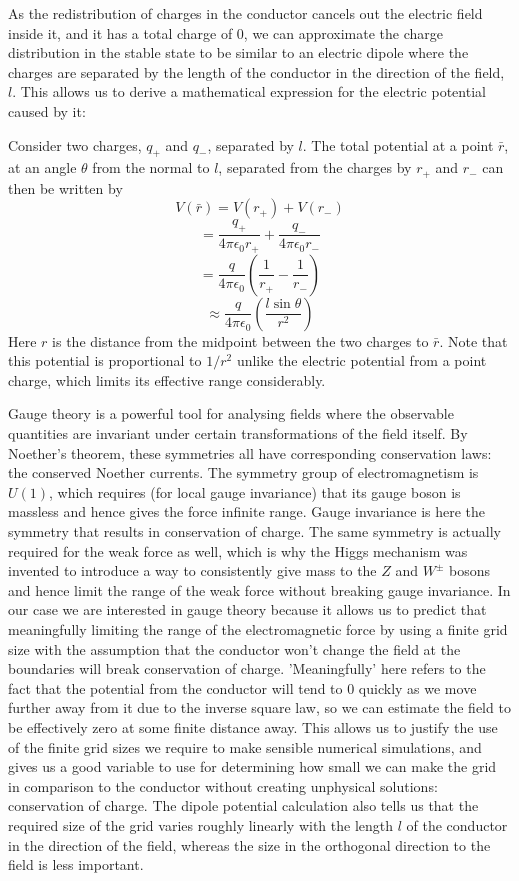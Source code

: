 \documentclass[a4paper,10pt]{article}
\begin{document}
As the redistribution of charges in the conductor cancels out the electric field inside it, and it has a total charge of 0, we can approximate the charge distribution in the stable state to be similar to an electric dipole where the charges are separated by the length of the conductor in the direction of the field, $l$. This allows us to derive a mathematical expression for the electric potential caused by it:

Consider two charges, $q_+$ and $q_-$, separated by $l$. The total potential at a point $\bar{r}$, at an angle $\theta$ from the normal to $l$, separated from the charges by $r_+$ and $r_-$ can then be written by
\[V(\bar{r}) = V(r_+) + V(r_-) \]
\[ = \frac{q_+}{4 \pi \epsilon_0 r_+} + \frac{q_-}{4 \pi \epsilon_0 r_-} \]
\[ = \frac{q}{4 \pi \epsilon_0}\left( \frac{1}{r_+} - \frac{1}{r_-} \right) \]
\[ \approx \frac{q}{4 \pi \epsilon_0} \left( \frac{l \sin\theta}{r^2} \right) \]
Here $r$ is the distance from the midpoint between the two charges to $\bar{r}$. Note that this potential is proportional to $1/r^2$ unlike the electric potential from a point charge, which limits its effective range considerably.

Gauge theory is a powerful tool for analysing fields where the observable quantities are invariant under certain transformations of the field itself. By Noether's theorem, these symmetries all have corresponding conservation laws: the conserved Noether currents. The symmetry group of electromagnetism is $U(1)$, which requires (for local gauge invariance) that its gauge boson is massless and hence gives the force infinite range. Gauge invariance is here the symmetry that results in conservation of charge. The same symmetry is actually required for the weak force as well, which is why the Higgs mechanism was invented to introduce a way to consistently give mass to the $Z$ and $W^{\pm}$ bosons and hence limit the range of the weak force without breaking gauge invariance. In our case we are interested in gauge theory because it allows us to predict that meaningfully limiting the range of the electromagnetic force by using a finite grid size with the assumption that the conductor won't change the field at the boundaries will break conservation of charge. 'Meaningfully' here refers to the fact that the potential from the conductor will tend to 0 quickly as we move further away from it due to the inverse square law, so we can estimate the field to be effectively zero at some finite distance away. This allows us to justify the use of the finite grid sizes we require to make sensible numerical simulations, and gives us a good variable to use for determining how small we can make the grid in comparison to the conductor without creating unphysical solutions: conservation of charge. The dipole potential calculation also tells us that the required size of the grid varies roughly linearly with the length $l$ of the conductor in the direction of the field, whereas the size in the orthogonal direction to the field is less important.
\end{document}
